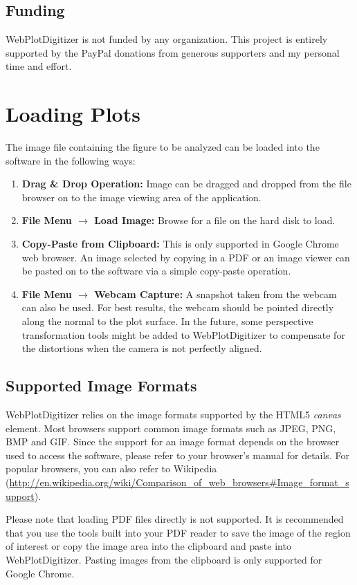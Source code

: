 \documentclass[letterpaper, 10pt]{article}
\begin{document}
\subsection{Funding}
WebPlotDigitizer is not funded by any organization. This project is entirely supported by the PayPal donations from generous supporters and my personal time and effort.

\section{Loading Plots}
The image file containing the figure to be analyzed can be loaded into the software in the following ways:
\begin{enumerate}
\item{{\bf Drag \& Drop Operation:} Image can be dragged and dropped from the file browser on to the image viewing area of the application.}
\item{{\bf File Menu $\rightarrow$ Load Image:} Browse for a file on the hard disk to load.}
\item{{\bf Copy-Paste from Clipboard:} This is only supported in Google Chrome web browser. An image selected by copying in a PDF or an image viewer can be pasted on to the software via a simple copy-paste operation.}
\item{{\bf File Menu $\rightarrow$ Webcam Capture:} A snapshot taken from the webcam can also be used. For best results, the webcam should be pointed directly along the normal to the plot surface. In the future, some perspective transformation tools might be added to WebPlotDigitizer to compensate for the distortions when the camera is not perfectly aligned.}  
\end{enumerate}

\subsection{Supported Image Formats}
WebPlotDigitizer relies on the image formats supported by the HTML5 \emph{canvas} element. Most browsers support common image formats such as JPEG, PNG, BMP and GIF. Since the support for an image format depends on the browser used to access the software, please refer to your browser's manual for details. For popular browsers, you can also refer to Wikipedia (\url{http://en.wikipedia.org/wiki/Comparison_of_web_browsers#Image_format_support}).

Please note that loading PDF files directly is not supported. It is recommended that you use the tools built into your PDF reader to save the image of the region of interest or copy the image area into the clipboard and paste into WebPlotDigitizer. Pasting images from the clipboard is only supported for Google Chrome.
\end{document}
